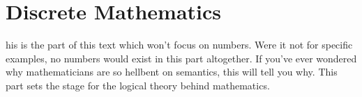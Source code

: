 
\part{Discrete Mathematics} %
\thispagestyle{empty}
his is the part of this text which won't focus on numbers.
Were it not for specific examples, no numbers would exist in this part altogether.
If you've ever wondered why mathematicians are so hellbent on semantics, this will tell you why.
This part sets the stage for the logical theory behind mathematics.
\setcounter{section}{0}





%

